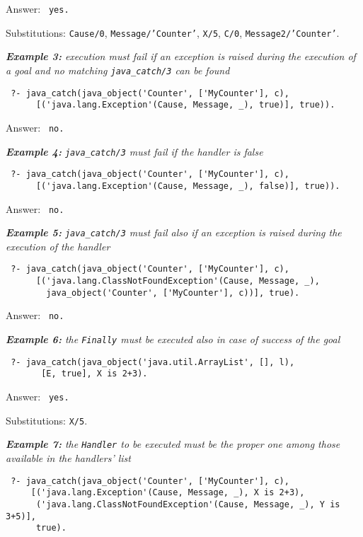 Answer: \texttt{ yes.}

Substitutions: \texttt{Cause/0}, \texttt{Message/'Counter'}, \texttt{X/5}, \texttt{C/0},
\texttt{Message2/'Counter'}.

\medskip
\textit{\textbf{Example 3:} execution must fail if an exception is raised during the execution of
a goal and no matching \texttt{java\_catch/3} can be found}
\begin{verbatim}
 ?- java_catch(java_object('Counter', ['MyCounter'], c),
      [('java.lang.Exception'(Cause, Message, _), true)], true)).
\end{verbatim}

Answer: \texttt{ no.}

\medskip
\textit{\textbf{Example 4:} \texttt{java\_catch/3} must fail if the handler is false}
\begin{verbatim}
 ?- java_catch(java_object('Counter', ['MyCounter'], c),
      [('java.lang.Exception'(Cause, Message, _), false)], true)).
\end{verbatim}

Answer: \texttt{ no.}

\medskip
\textit{\textbf{Example 5:} \texttt{java\_catch/3} must fail also if an exception is raised during
the execution of the handler}
\begin{verbatim}
 ?- java_catch(java_object('Counter', ['MyCounter'], c),
      [('java.lang.ClassNotFoundException'(Cause, Message, _),
        java_object('Counter', ['MyCounter'], c))], true).
\end{verbatim}

Answer: \texttt{ no.}

\medskip
\textit{\textbf{Example 6:} the \textit{\texttt{Finally}} must be executed also in case of success
of the goal}
\begin{verbatim}
 ?- java_catch(java_object('java.util.ArrayList', [], l),
       [E, true], X is 2+3).
\end{verbatim}

Answer: \texttt{ yes.}

Substitutions: \texttt{X/5}.

\medskip
\textit{\textbf{Example 7:} the \textit{\texttt{Handler}} to be executed must be the proper one
among those available in the handlers' list}
\begin{verbatim}
 ?- java_catch(java_object('Counter', ['MyCounter'], c),
     [('java.lang.Exception'(Cause, Message, _), X is 2+3),
      ('java.lang.ClassNotFoundException'(Cause, Message, _), Y is 3+5)],
      true).
\end{verbatim}

